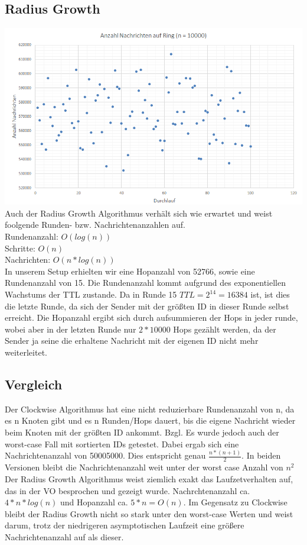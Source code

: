 \documentclass[12pt,a4paper]{report}
\begin{document}
\subsection*{Radius Growth}
\includegraphics[width=\textwidth]{rg.png}
Auch der Radius Growth Algorithmus verhält sich wie erwartet und weist foolgende Runden- bzw. Nachrichtenanzahlen auf.\\
Rundenanzahl: $O(log(n))$\\
Schritte: $O(n)$\\
Nachrichten: $O(n*log(n))$\\
In unserem Setup erhielten wir eine Hopanzahl von 52766, sowie eine Rundenanzahl von 15. Die Rundenanzahl kommt aufgrund des
exponentiellen Wachstums der TTL zustande. Da in Runde 15 $TTL = 2^{14} = 16384$ ist, ist dies die letzte Runde, da sich der Sender mit
der größten ID in dieser Runde selbst erreicht. Die Hopanzahl ergibt sich durch aufsummieren der Hops in jeder runde, wobei aber in der
letzten Runde nur $2*10000$ Hops gezählt werden, da der Sender ja seine die erhaltene Nachricht mit der eigenen ID nicht mehr weiterleitet.

\subsection*{Vergleich}
Der Clockwise Algorithmus hat eine nicht reduzierbare Rundenanzahl von n, da es n Knoten gibt und es n Runden/Hops dauert, bis die
eigene Nachricht wieder beim Knoten mit der größten ID ankommt.
Bzgl. Es wurde jedoch auch der worst-case Fall mit sortierten IDs getestet. Dabei ergab sich eine Nachrichtenanzahl von 50005000. Dies entspricht genau $\frac{n*(n+1)}{2}$. In beiden Versionen bleibt die Nachrichtenanzahl weit unter der worst case Anzahl von $n^2$\\
Der Radius Growth Algorithmus weist ziemlich exakt das Laufzetverhalten auf, das in der VO besprochen und gezeigt wurde. Nachrchtenanzahl ca. $4*n*log(n)$ und Hopanzahl ca. $5*n = O(n)$. Im Gegensatz zu Clockwise bleibt der Radius Growth nicht so stark unter den worst-case Werten und weist darum, trotz der niedrigeren asymptotischen Laufzeit eine größere Nachrichtenanzahl auf als dieser.
\end{document}
